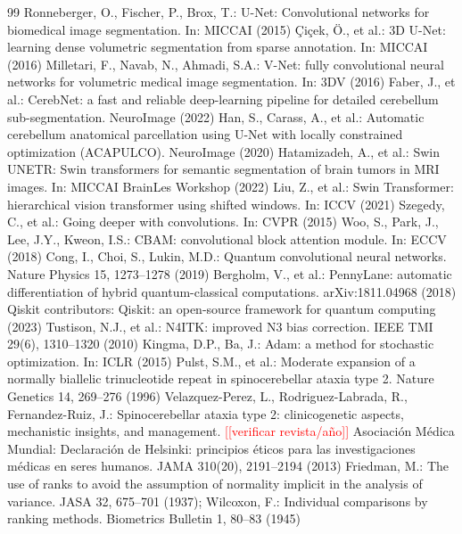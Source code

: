 \documentclass[runningheads]{llncs}
\newcommand{\todo}[1]{\textcolor{red}{[[#1]]}}
\begin{document}
\begin{thebibliography}{99}
 Ronneberger, O., Fischer, P., Brox, T.: U-Net: Convolutional networks for biomedical image segmentation. In: MICCAI (2015)
 \c{C}i\c{c}ek, \"O., et al.: 3D U-Net: learning dense volumetric segmentation from sparse annotation. In: MICCAI (2016)
 Milletari, F., Navab, N., Ahmadi, S.A.: V-Net: fully convolutional neural networks for volumetric medical image segmentation. In: 3DV (2016)
 Faber, J., et al.: CerebNet: a fast and reliable deep-learning pipeline for detailed cerebellum sub-segmentation. NeuroImage (2022)
 Han, S., Carass, A., et al.: Automatic cerebellum anatomical parcellation using U-Net with locally constrained optimization (ACAPULCO). NeuroImage (2020)
 Hatamizadeh, A., et al.: Swin UNETR: Swin transformers for semantic segmentation of brain tumors in MRI images. In: MICCAI BrainLes Workshop (2022)
 Liu, Z., et al.: Swin Transformer: hierarchical vision transformer using shifted windows. In: ICCV (2021)
 Szegedy, C., et al.: Going deeper with convolutions. In: CVPR (2015)
 Woo, S., Park, J., Lee, J.Y., Kweon, I.S.: CBAM: convolutional block attention module. In: ECCV (2018)
 Cong, I., Choi, S., Lukin, M.D.: Quantum convolutional neural networks. Nature Physics 15, 1273--1278 (2019)
 Bergholm, V., et al.: PennyLane: automatic differentiation of hybrid quantum-classical computations. arXiv:1811.04968 (2018)
 Qiskit contributors: Qiskit: an open-source framework for quantum computing (2023)
 Tustison, N.J., et al.: N4ITK: improved N3 bias correction. IEEE TMI 29(6), 1310--1320 (2010)
 Kingma, D.P., Ba, J.: Adam: a method for stochastic optimization. In: ICLR (2015)
 Pulst, S.M., et al.: Moderate expansion of a normally biallelic trinucleotide repeat in spinocerebellar ataxia type 2. Nature Genetics 14, 269--276 (1996)
 Velazquez-Perez, L., Rodriguez-Labrada, R., Fernandez-Ruiz, J.: Spinocerebellar ataxia type 2: clinicogenetic aspects, mechanistic insights, and management. \todo{verificar revista/año}
 Asociación Médica Mundial: Declaración de Helsinki: principios éticos para las investigaciones médicas en seres humanos. JAMA 310(20), 2191--2194 (2013)
 Friedman, M.: The use of ranks to avoid the assumption of normality implicit in the analysis of variance. JASA 32, 675--701 (1937); Wilcoxon, F.: Individual comparisons by ranking methods. Biometrics Bulletin 1, 80--83 (1945)
\end{thebibliography}
\end{document}
